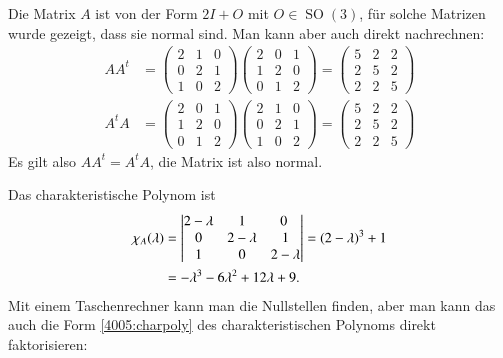 \begin{loesung}
Die Matrix $A$ ist von der Form $2I+O$ mit $O\in\operatorname{SO}(3)$,
für solche Matrizen wurde gezeigt, dass sie normal sind.
Man kann aber auch direkt nachrechnen:
\begin{align*}
AA^t
&=
\begin{pmatrix}
2&1&0\\
0&2&1\\
1&0&2
\end{pmatrix}
\begin{pmatrix}
2&0&1\\
1&2&0\\
0&1&2
\end{pmatrix}
=
\begin{pmatrix}
5&2&2\\
2&5&2\\
2&2&5
\end{pmatrix}
\\
A^tA
&=
\begin{pmatrix}
2&0&1\\
1&2&0\\
0&1&2
\end{pmatrix}
\begin{pmatrix}
2&1&0\\
0&2&1\\
1&0&2
\end{pmatrix}
=
\begin{pmatrix}
5&2&2\\
2&5&2\\
2&2&5
\end{pmatrix}
\end{align*}
Es gilt also $AA^t=A^tA$, die Matrix ist also normal.
\begin{teilaufgaben}
\item Das charakteristische Polynom ist
\begin{align}
\chi_A(\lambda)
&=\left|
\begin{matrix}
2-\lambda &    1      &      0     \\
    0     & 2-\lambda &      1     \\
    1     &    0      & 2-\lambda
\end{matrix}
\right|
=
(2-\lambda)^3+1
\label{4005:charpoly}
\\
&=-\lambda^3 -6\lambda^2 + 12\lambda +9.
\notag
\end{align}
Mit einem Taschenrechner kann man die Nullstellen finden,
aber man kann das auch die Form \eqref{4005:charpoly}
des charakteristischen Polynoms direkt faktorisieren:
\begin{align*}

\end{align*}
\end{teilaufgaben}
\end{loesung}
